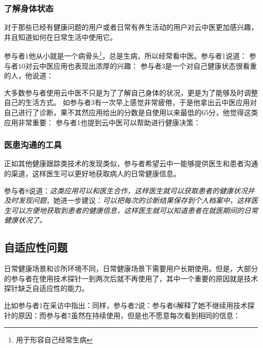 \subsubsection{了解身体状态}

对于那些已经有健康问题的用户或者日常有养生活动的用户对云中医更加感兴趣，并且知道如何在日常生活中使用它。

参与者1他从小就是一个病骨头\footnote{用于形容自己经常生病}，总是生病，所以经常看中医。参与者1说道：
参与者10对云中医应用也表现出浓厚的兴趣：
参与者3是一个对自己健康状态很看重的人，他说道：

大多数参与者使用云中医不只是为了了解自己身体的状况，更是为了能够及时调整自己的生活方式。
如参与者3有一次早上感觉非常疲倦，于是他拿出云中医应用对自己进行了诊断，果不其然应用给出的分数是自使用以来最低的65分，他觉得这类应用非常重要：
参与者1也提到云中医可以帮助进行健康决策：

\subsubsection{医患沟通的工具}

正如其他健康跟踪类技术的发现类似，参与者希望云中一能够提供医生和患者沟通的渠道，这样医生可以更好地获取病人的日常健康信息。

参与者8说道：\textit{这类应用可以和医生合作，这样医生就可以获取患者的健康状况并及时发现问题}，她进一步建议：\textit{可以把每次的诊断结果保存到个人档案中，这样医生可以方便地获取到患者的健康信息，这样医生就可以知道患者在就医期间的日常健康状况了。}


\subsection{自适应性问题}

日常健康场景和诊所环境不同，日常健康场景下需要用户长期使用。但是，大部分的参与者在使用技术探针一到两次后就不再使用了，其中一个重要的原因就是技术探针缺乏自适应性的能力。

比如参与者1在采访中指出：同样，参与者2说：参与者6解释了她不继续用技术探针的原因：而参与者7虽然在持续使用，但是也不愿意每次看到相同的信息：


